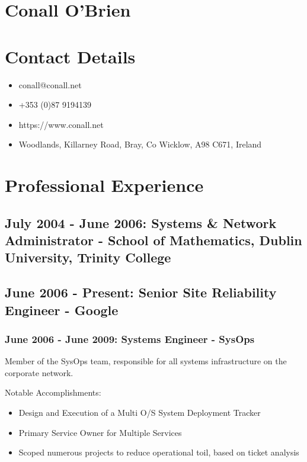 \documentclass[a4paper, 10pt] {article}
\begin{document}
\section*{Conall O'Brien}

\section*{Contact Details}

\begin{itemize}
 \item conall@conall.net
 \item +353 (0)87 9194139
 \item https://www.conall.net
 \item Woodlands, Killarney Road, Bray, Co Wicklow, A98 C671, Ireland
\end{itemize}

\section*{Professional Experience}

\subsection*{July 2004 - June 2006: Systems \& Network Administrator - School of Mathematics, Dublin University, Trinity College}

\subsection*{June 2006 - Present: Senior Site Reliability Engineer - Google}

\subsubsection*{June 2006 - June 2009: Systems Engineer - SysOps}

Member of the SysOps team, responsible for all systems infrastructure on the corporate network.

\vspace{5mm} %

Notable Accomplishments:

\begin{itemize}
  \item Design and Execution of a Multi O/S System Deployment Tracker
  \item Primary Service Owner for Multiple Services
  \item Scoped numerous projects to reduce operational toil, based on ticket analysis
\end{itemize}
\end{document}
